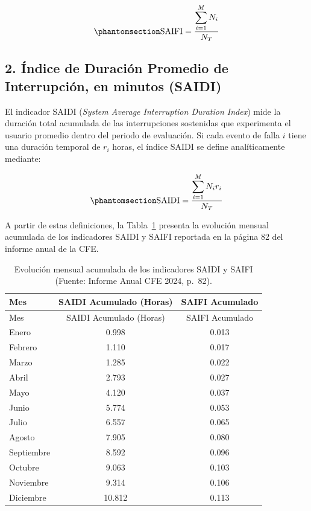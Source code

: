 \documentclass[
  spanish,
  us-letterpaper,
]{scrreprt}
\numberwithin{equation}{section}
\theoremstyle{plain}
\theoremstyle{plain}
\theoremstyle{plain}
\theoremstyle{definition}
\theoremstyle{remark}
\begin{document}
\begin{equation}\phantomsection\label{eq-saifi}{
\displaystyle \text{SAIFI} = \displaystyle \dfrac{\displaystyle \sum_{i=1}^{M} N_i}{N_T}
}\end{equation}

\subsection{2. Índice de Duración Promedio de Interrupción, en minutos
(SAIDI)}\label{uxedndice-de-duraciuxf3n-promedio-de-interrupciuxf3n-en-minutos-saidi}

El indicador SAIDI (\emph{System Average Interruption Duration Index})
mide la duración total acumulada de las interrupciones sostenidas que
experimenta el usuario promedio dentro del periodo de evaluación. Si
cada evento de falla \(i\) tiene una duración temporal de \(r_i\) horas,
el índice SAIDI se define analíticamente mediante:

\begin{equation}\phantomsection\label{eq-saidi}{
\displaystyle \text{SAIDI} = \displaystyle \dfrac{\displaystyle \sum_{i=1}^{M} N_i r_i}{N_T}
}\end{equation}

A partir de estas definiciones, la Tabla~\ref{tbl-saidi-saifi} presenta
la evolución mensual acumulada de los indicadores SAIDI y SAIFI
reportada en la página 82 del informe anual de la CFE.

\begin{longtable}[]{@{}lcc@{}}
\caption{Evolución mensual acumulada de los indicadores SAIDI y SAIFI
(Fuente: Informe Anual CFE 2024,
p.~82).}\label{tbl-saidi-saifi}\tabularnewline
\toprule\noalign{}
Mes & SAIDI Acumulado (Horas) & SAIFI Acumulado \\
\midrule\noalign{}
\endfirsthead
\toprule\noalign{}
Mes & SAIDI Acumulado (Horas) & SAIFI Acumulado \\
\midrule\noalign{}
\endhead
\bottomrule\noalign{}
\endlastfoot
Enero & 0.998 & 0.013 \\
Febrero & 1.110 & 0.017 \\
Marzo & 1.285 & 0.022 \\
Abril & 2.793 & 0.027 \\
Mayo & 4.120 & 0.037 \\
Junio & 5.774 & 0.053 \\
Julio & 6.557 & 0.065 \\
Agosto & 7.905 & 0.080 \\
Septiembre & 8.592 & 0.096 \\
Octubre & 9.063 & 0.103 \\
Noviembre & 9.314 & 0.106 \\
Diciembre & 10.812 & 0.113 \\
\end{longtable}
\end{document}
